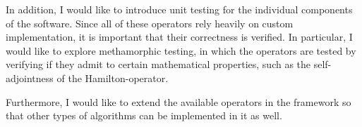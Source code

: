 In addition, I would like to introduce unit testing for the individual components of the software. Since all of these operators rely heavily on custom implementation, it is important that their correctness is verified. In particular, I would like to explore methamorphic testing, in which the operators are tested by verifying if they admit to certain mathematical properties, such as the self-adjointness of the Hamilton-operator.

Furthermore, I would like to extend the available operators in the framework so that other types of algorithms can be implemented in it as well.
